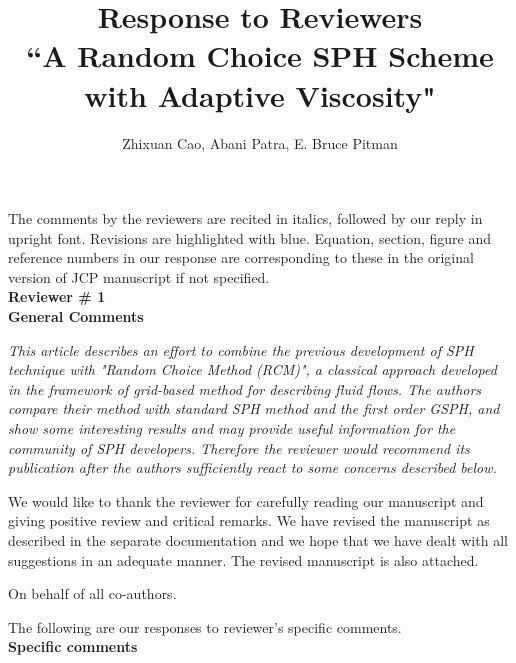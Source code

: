 \documentclass[10pt,a4paper]{article}
\begin{document}
\author{\Large {Zhixuan Cao, Abani Patra, E. Bruce Pitman}}

\title{
\LARGE \textbf{Response to Reviewers} \\
\Large \textbf{``A Random Choice SPH Scheme with Adaptive Viscosity"}}

\date{\vspace{-5ex}}

\maketitle
The comments by the reviewers are recited in italics, followed by our reply in upright font. Revisions are highlighted with blue. Equation, section, figure and reference numbers in our response are corresponding to these in the original 
version of JCP manuscript if not specified. \\[12pt]

\textbf{\Large Reviewer \# 1}\\[3pt]

\textbf{\large General Comments}

\textit{This article describes an effort to combine the previous development of SPH technique with "Random Choice Method (RCM)", a classical approach developed in the framework of grid-based method for
describing fluid flows. The authors compare their method with standard SPH method and the first order GSPH, and show some interesting results and may provide useful information for the community of SPH developers. Therefore the reviewer would recommend its publication after the authors sufficiently react to some concerns described below.} 

We would like to thank the reviewer for carefully reading our manuscript and giving positive review and critical remarks.
We have revised the manuscript as described in the separate documentation and we hope that we have dealt with all suggestions in an adequate manner. The revised manuscript is also attached.
 
On behalf of all co-authors.

The following are our responses to reviewer's specific comments.\\[12pt]

\textbf{\large Specific comments}
\end{document}
